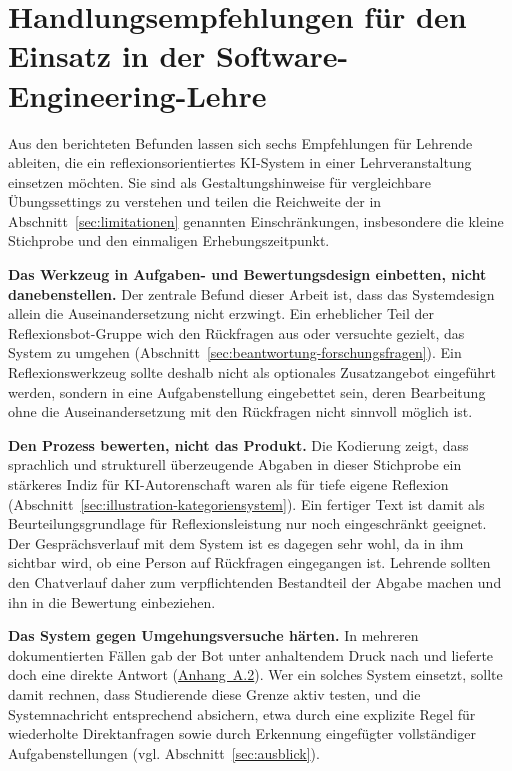 \newpage
\section{Handlungsempfehlungen für den Einsatz in der Software-Engineering-Lehre}
\label{sec:handlungsempfehlungen}

Aus den berichteten Befunden lassen sich sechs Empfehlungen für Lehrende ableiten, die ein
reflexionsorientiertes KI-System in einer Lehrveranstaltung einsetzen möchten. Sie sind als
Gestaltungshinweise für vergleichbare Übungssettings zu verstehen und teilen die Reichweite der in
Abschnitt~\ref{sec:limitationen} genannten Einschränkungen, insbesondere die kleine Stichprobe und den
einmaligen Erhebungszeitpunkt.

\textbf{Das Werkzeug in Aufgaben- und Bewertungsdesign einbetten, nicht danebenstellen.} Der zentrale
Befund dieser Arbeit ist, dass das Systemdesign allein die Auseinandersetzung nicht erzwingt. Ein
erheblicher Teil der Reflexionsbot-Gruppe wich den Rückfragen aus oder versuchte gezielt, das System
zu umgehen (Abschnitt~\ref{sec:beantwortung-forschungsfragen}). Ein Reflexionswerkzeug sollte deshalb
nicht als optionales Zusatzangebot eingeführt werden, sondern in eine Aufgabenstellung eingebettet
sein, deren Bearbeitung ohne die Auseinandersetzung mit den Rückfragen nicht sinnvoll möglich ist.

\textbf{Den Prozess bewerten, nicht das Produkt.} Die Kodierung zeigt, dass sprachlich und strukturell
überzeugende Abgaben in dieser Stichprobe ein stärkeres Indiz für KI-Autorenschaft waren als für tiefe
eigene Reflexion (Abschnitt~\ref{sec:illustration-kategoriensystem}). Ein fertiger Text ist damit als
Beurteilungsgrundlage für Reflexionsleistung nur noch eingeschränkt geeignet. Der Gesprächsverlauf mit
dem System ist es dagegen sehr wohl, da in ihm sichtbar wird, ob eine Person auf Rückfragen eingegangen
ist. Lehrende sollten den Chatverlauf daher zum verpflichtenden Bestandteil der Abgabe machen und ihn
in die Bewertung einbeziehen.

\textbf{Das System gegen Umgehungsversuche härten.} In mehreren dokumentierten Fällen gab der Bot
unter anhaltendem Druck nach und lieferte doch eine direkte Antwort
(\hyperref[app:kodierungstabelle]{Anhang~A.2}). Wer ein solches System einsetzt, sollte damit rechnen,
dass Studierende diese Grenze aktiv testen, und die Systemnachricht entsprechend absichern, etwa durch
eine explizite Regel für wiederholte Direktanfragen sowie durch Erkennung eingefügter vollständiger
Aufgabenstellungen (vgl. Abschnitt~\ref{sec:ausblick}).

